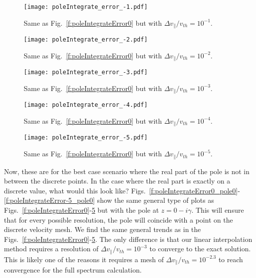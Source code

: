 \begin{figure}[!htb]
	\texttt{[image: poleIntegrate\_error\_-1.pdf]}
	\caption{Same as Fig.~\ref{f:poleIntegrateError0} but with $\Delta v_\parallel/v_{th}=10^{-1}$.}
	\label{f:poleIntegrateError-1}
\end{figure}

\begin{figure}[!htb]
	\texttt{[image: poleIntegrate\_error\_-2.pdf]}
	\caption{Same as Fig.~\ref{f:poleIntegrateError0} but with $\Delta v_\parallel/v_{th}=10^{-2}$.}
	\label{f:poleIntegrateError-2}
\end{figure}

\begin{figure}[!htb]
	\texttt{[image: poleIntegrate\_error\_-3.pdf]}
	\caption{Same as Fig.~\ref{f:poleIntegrateError0} but with $\Delta v_\parallel/v_{th}=10^{-3}$.}
	\label{f:poleIntegrateError-3}
\end{figure}

\begin{figure}[!htb]
	\texttt{[image: poleIntegrate\_error\_-4.pdf]}
	\caption{Same as Fig.~\ref{f:poleIntegrateError0} but with $\Delta v_\parallel/v_{th}=10^{-4}$.}
	\label{f:poleIntegrateError-4}
\end{figure}

\begin{figure}[!htb]
	\texttt{[image: poleIntegrate\_error\_-5.pdf]}
	\caption{Same as Fig.~\ref{f:poleIntegrateError0} but with $\Delta v_\parallel/v_{th}=10^{-5}$.}
	\label{f:poleIntegrateError-5}
\end{figure}

Now, these are for the best case scenario where the real part of the pole is not in between the discrete points.
In the case where the real part is exactly on a discrete value, what would this look like? 
Figs.~\ref{f:poleIntegrateError0_pole0}-\ref{f:poleIntegrateError-5_pole0} show the same general type of plots as Figs.~\ref{f:poleIntegrateError0}-\ref{f:poleIntegrateError-5} but with the pole at $z=0-i\gamma$.
This will ensure that for every possible resolution, the pole will coincide with a point on the discrete velocity mesh.
We find the same general trends as in the Figs.~\ref{f:poleIntegrateError0}-\ref{f:poleIntegrateError-5}.
The only difference is that our linear interpolation method requires a resolution of $\Delta v_\parallel/v_{th}=10^{-3}$ to converge to the exact solution.
This is likely one of the reasons it requires a mesh of $\Delta v_\parallel/v_{th}=10^{-2.3}$ to reach convergence for the full spectrum calculation.


